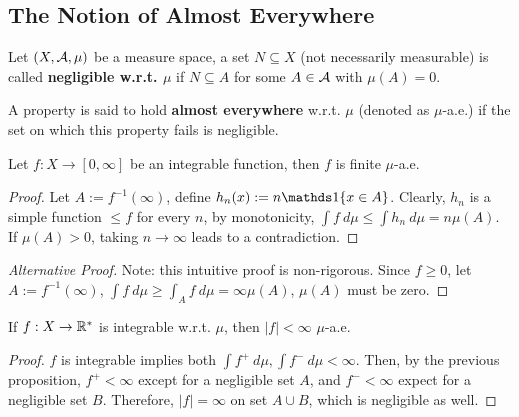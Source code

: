 \documentclass[11pt]{article}
\newcommand{\dmu}[0]{\ d\mu}
\begin{document}
	\subsection{The Notion of Almost Everywhere}
	\begin{definition}
		Let $(X, \mathcal{{A}}, \mu)$ be a measure space, a set $N \subseteq X$ (not necessarily measurable) is called \textbf{negligible w.r.t. $\mu$} if $N \subseteq A$ for some $A \in \mathcal{{A}}$ with $\mu(A)=0$.
		
		A property is said to hold \textbf{almost everywhere} w.r.t. $\mu$ (denoted as $\mu$-a.e.) if the set on which this property fails is negligible.
	\end{definition}
	
	\begin{proposition}
		Let $f: X \to [0, \infty]$ be an integrable function, then $f$ is finite $\mu$-a.e.
		\begin{proof}
			Let $A := f^{-1}(\infty)$, define $h_n(x) := n \id{x \in A}$. Clearly, $h_n$ is a simple function $\leq f$ for every $n$, by monotonicity, $\int f\ d\mu \leq \int h_n\ d\mu = n \mu(A)$. 
			If $\mu(A) > 0$, taking $n\to\infty$ leads to a contradiction.
		\end{proof}
		
		\begin{proof}[Alternative Proof]
			Note: this intuitive proof is non-rigorous.
			Since $f \geq 0$, let $A := f^{-1}(\infty)$, $\int f \dmu \geq \int_A f\dmu = \infty \mu(A)$, $\mu(A)$ must be zero.
		\end{proof}
	\end{proposition}
	
	\begin{corollary}
		If $f: X \to \mathbb{R}^*$ is integrable w.r.t. $\mu$, then $|f| < \infty$ $\mu$-a.e.
		\begin{proof}
			$f$ is integrable implies both $\int f^+\ d\mu, \int f^-\ d\mu < \infty$. Then,
			by the previous proposition, $f^+ < \infty$ except for a negligible set $A$, and $f^- < \infty$ expect for a negligible set $B$. Therefore, $|f| = \infty$ on set $A \cup B$, which is negligible as well.
		\end{proof}
	\end{corollary}
	
\end{document}
